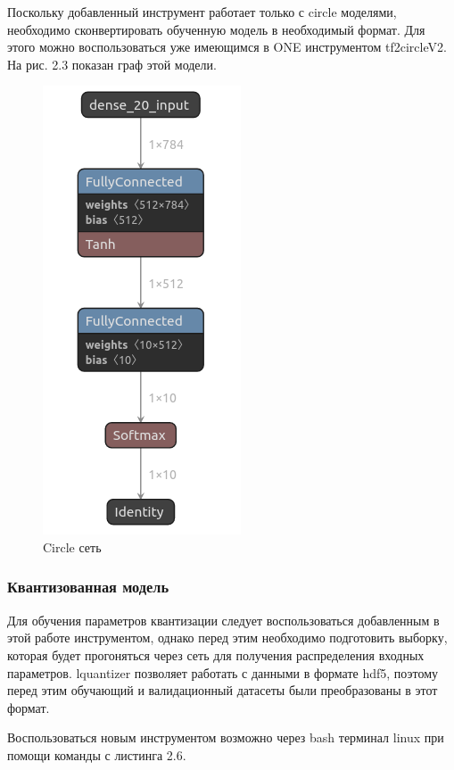 Поскольку добавленный инструмент работает только с circle моделями, необходимо сконвертировать обученную модель в необходимый формат. Для этого можно воспользоваться уже имеющимся в ONE инструментом tf2circleV2. На рис. 2.3 показан граф этой модели.

\begin{figure}[H]
    \begin{center}
        \includegraphics[scale=0.5]{tex/inc/img/circle.png}
        \caption{Circle сеть}
    \end{center}
\end{figure}

\subsubsection{Квантизованная модель}

Для обучения параметров квантизации следует воспользоваться добавленным в этой работе инструментом, однако перед этим необходимо подготовить выборку, которая будет прогоняться через сеть для получения распределения входных параметров. lquantizer позволяет работать с данными в формате hdf5, поэтому перед этим обучающий и валидационный датасеты были преобразованы в этот формат.

Воспользоваться новым инструментом возможно через bash терминал linux при помощи команды с листинга 2.6.

